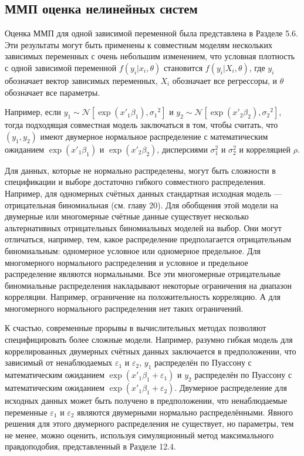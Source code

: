 \subsection{ММП оценка нелинейных систем}

Оценка ММП для одной зависимой переменной была представлена в Разделе 5.6. Эти результаты могут быть применены к совместным моделям нескольких зависимых переменных с очень небольшим изменением, что условная плотность с одной зависимой переменной $f(y_i|x_i,\theta)$ становится $f(y_i|X_i,\theta)$, где $y_i$ обозначает вектор зависимых переменных, $X_i$ обозначает все регрессоры, и $\theta$ обозначает все параметры.

Например, если $y_1 \sim \mathcal{N}[\exp(x'_1 \beta_1),{\sigma_1}^2]$ и $y_2 \sim \mathcal{N}[\exp(x'_2 \beta_2),{\sigma_2}^2]$, тогда подходящая совместная модель заключаться в том, чтобы считать, что $(y_1,y_2)$ имеют двумерное нормальное распределение с математическим ожиданием $\exp(x'_1\beta_1)$ и $\exp(x'_2\beta_2)$, дисперсиями $\sigma^2_1$ и $\sigma^2_2$ и корреляцией $\rho$.

Для данных, которые не нормально распределены, могут быть сложности в спецификации и выборе достаточно гибкого совместного распределения. Например, для одномерных счётных данных стандартная исходная модель --- отрицательная биномиальная (см. главу 20). Для обобщения этой модели на двумерные или многомерные счётные данные существует несколько альтернативных отрицательных биномиальных моделей на выбор. Они могут отличаться, например, тем, какое распределение  предполагается отрицательным биномиальным: одномерное условное  или одномерное предельное. Для многомерного нормального распределения и условное и предельное распределение являются  нормальными. Все эти многомерные отрицательные биномиальные распределения накладывают некоторые ограничения на диапазон корреляции. Например,  ограничение на положительность корреляцию. А для многомерного нормального распределения нет таких ограничений.

К счастью, современные прорывы в вычислительных методах позволяют специфицировать более сложные модели. Например, разумно гибкая модель для коррелированных двумерных счётных данных заключается в предположении, что зависимый от ненаблюдаемых $\varepsilon_1$ и $\varepsilon_2$, $y_1$ распределён по Пуассону с математическим ожиданием $\exp(x'_1 \beta_1 + \varepsilon_1)$ и $y_2$ распределён по Пуассону с математическим ожиданием $\exp(x'_1 \beta_1 + \varepsilon_2)$. Двумерное распределение для исходных данных может быть получено в предположении, что ненаблюдаемые переменные $\varepsilon_1$ и $\varepsilon_2$ являются двумерными нормально распределёнными. Явного решения для этого двумерного распределения не существует, но параметры, тем не менее, можно оценить, используя симуляционный метод максимального правдоподобия, представленный в Разделе 12.4.

